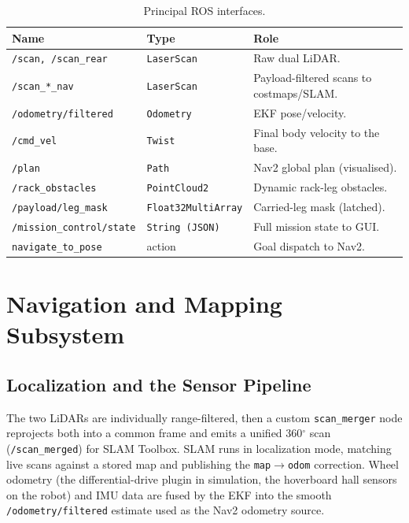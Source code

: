 \documentclass[11pt,a4paper]{article}
\newcommand{\code}[1]{\texttt{\small #1}}
\begin{document}
\begin{table}[h]\centering\small
\caption{Principal ROS interfaces.}\label{tab:topics}
\begin{tabular}{@{}llp{6.8cm}@{}}
\toprule
\textbf{Name} & \textbf{Type} & \textbf{Role}\\
\midrule
\code{/scan,\,/scan\_rear} & \code{LaserScan} & Raw dual LiDAR.\\
\code{/scan\_*\_nav} & \code{LaserScan} & Payload-filtered scans to costmaps/SLAM.\\
\code{/odometry/filtered} & \code{Odometry} & EKF pose/velocity.\\
\code{/cmd\_vel} & \code{Twist} & Final body velocity to the base.\\
\code{/plan} & \code{Path} & Nav2 global plan (visualised).\\
\code{/rack\_obstacles} & \code{PointCloud2} & Dynamic rack-leg obstacles.\\
\code{/payload/leg\_mask} & \code{Float32MultiArray} & Carried-leg mask (latched).\\
\code{/mission\_control/state} & \code{String\,(JSON)} & Full mission state to GUI.\\
\code{navigate\_to\_pose} & action & Goal dispatch to Nav2.\\
\bottomrule
\end{tabular}
\end{table}

\section{Navigation and Mapping Subsystem}\label{sec:nav}
\subsection{Localization and the Sensor Pipeline}
The two LiDARs are individually range-filtered, then a custom
\code{scan\_merger} node reprojects both into a common frame and emits a
unified 360$^\circ$ scan (\code{/scan\_merged}) for SLAM Toolbox. SLAM runs in
localization mode, matching live scans against a stored map and publishing
the \code{map}$\rightarrow$\code{odom} correction. Wheel odometry (the
differential-drive plugin in simulation, the hoverboard hall sensors on the robot) and
IMU data are fused by the EKF into the smooth
\code{/odometry/filtered} estimate used as the Nav2 odometry source.
\end{document}
